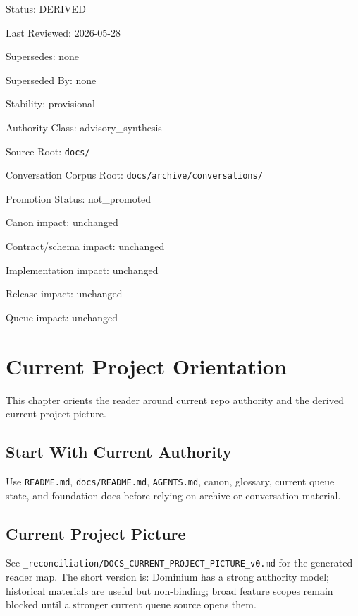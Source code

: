 \documentclass[10.5pt,a4paper]{book}
\begin{document}
Status: DERIVED

Last Reviewed: 2026-\allowbreak{}05-\allowbreak{}28

Supersedes: none

Superseded By: none

Stability: provisional

Authority Class: advisory\_\allowbreak{}synthesis

Source Root: \texttt{docs/\allowbreak{}}

Conversation Corpus Root: \texttt{docs/\allowbreak{}archive/\allowbreak{}conversations/\allowbreak{}}

Promotion Status: not\_\allowbreak{}promoted

Canon impact: unchanged

Contract/\allowbreak{}schema impact: unchanged

Implementation impact: unchanged

Release impact: unchanged

Queue impact: unchanged


\part{Current Project Orientation}

This chapter orients the reader around current repo authority and the derived current project picture.\allowbreak{}


\chapter{Start With Current Authority}

Use \texttt{README.\allowbreak{}md}, \texttt{docs/\allowbreak{}README.\allowbreak{}md}, \texttt{AGENTS.\allowbreak{}md}, canon, glossary, current queue state, and foundation docs before relying on archive or conversation material.\allowbreak{}


\chapter{Current Project Picture}

See \texttt{\_\allowbreak{}reconciliation/\allowbreak{}DOCS\_\allowbreak{}CURRENT\_\allowbreak{}PROJECT\_\allowbreak{}PICTURE\_\allowbreak{}v0.\allowbreak{}md} for the generated reader map.\allowbreak{} The short version is: Dominium has a strong authority model; historical materials are useful but non-\allowbreak{}binding; broad feature scopes remain blocked until a stronger current queue source opens them.\allowbreak{}
\end{document}

